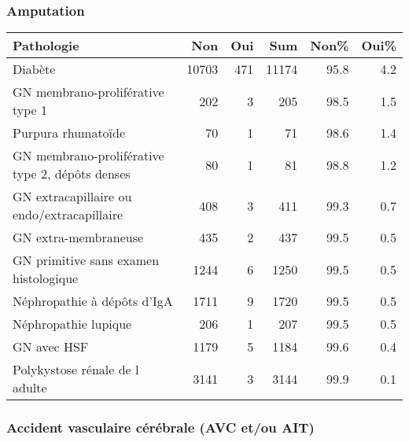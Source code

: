 \documentclass[11pt,a4paper]{article}\usepackage[]{graphicx}\usepackage[]{color}
\begin{document}
\subsubsection*{Amputation}

\begin{table}[H]
\centering
\begin{tabular}{lrrrrr}
  \hline
Pathologie & Non & Oui & Sum & Non\% & Oui\% \\ 
  \hline
Diabète & 10703 & 471 & 11174 & 95.8 & 4.2 \\ 
  GN membrano-proliférative type 1 & 202 &  3 & 205 & 98.5 & 1.5 \\ 
  Purpura rhumatoïde & 70 &  1 & 71 & 98.6 & 1.4 \\ 
  GN membrano-proliférative type 2, dépôts denses & 80 &  1 & 81 & 98.8 & 1.2 \\ 
  GN extracapillaire ou endo/extracapillaire & 408 &  3 & 411 & 99.3 & 0.7 \\ 
  GN extra-membraneuse & 435 &  2 & 437 & 99.5 & 0.5 \\ 
  GN primitive sans examen histologique & 1244 &  6 & 1250 & 99.5 & 0.5 \\ 
  Néphropathie à dépôts d'IgA & 1711 &  9 & 1720 & 99.5 & 0.5 \\ 
  Néphropathie lupique & 206 &  1 & 207 & 99.5 & 0.5 \\ 
  GN avec HSF & 1179 &  5 & 1184 & 99.6 & 0.4 \\ 
  Polykystose rénale de l adulte & 3141 &  3 & 3144 & 99.9 & 0.1 \\ 
   \hline
\end{tabular}
\end{table}


\subsubsection*{Accident vasculaire cérébrale (AVC et/ou AIT)}
\end{document}
